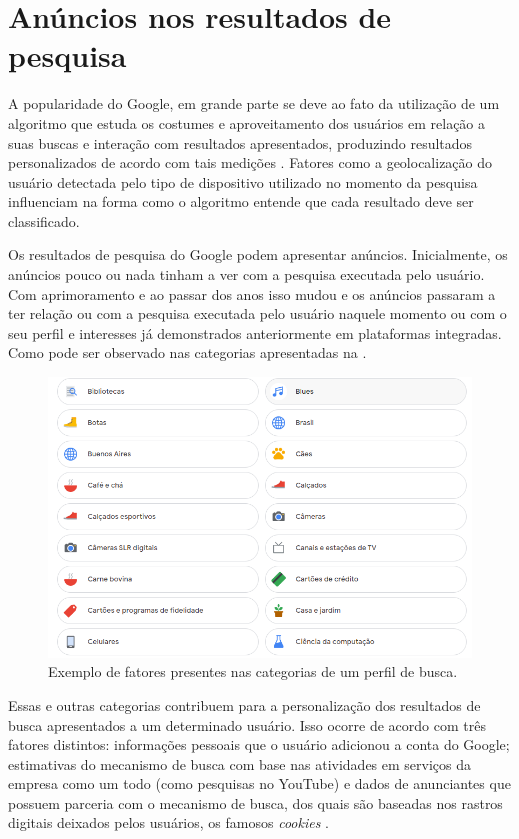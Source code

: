 \documentclass[portuguese]{textolivre}
\begin{document}
\section{Anúncios nos resultados de pesquisa}\label{sec-normas}
A popularidade do Google, em grande parte se deve ao fato da utilização de um algoritmo que estuda os costumes e aproveitamento dos usuários em relação a suas buscas e interação com resultados apresentados, produzindo resultados personalizados de acordo com tais medições \cite{yus_en_2011}. Fatores como a geolocalização do usuário detectada pelo tipo de dispositivo utilizado no momento da pesquisa influenciam na forma como o algoritmo entende que cada resultado deve ser classificado.

Os resultados de pesquisa do Google podem apresentar anúncios. Inicialmente, os anúncios pouco ou nada tinham a ver com a pesquisa executada pelo usuário. Com aprimoramento e ao passar dos anos isso mudou e os anúncios passaram a ter relação ou com a pesquisa executada pelo usuário naquele momento ou com o seu perfil e interesses já demonstrados anteriormente em plataformas integradas. Como pode ser observado nas categorias apresentadas na .

\begin{figure}[h!]
    \centering
    \includegraphics[width=0.8\linewidth]{fig-001.png}
    \caption{Exemplo de fatores presentes nas categorias de um perfil de busca.}
    \label{fig1}
\end{figure}

Essas e outras categorias contribuem para a personalização dos resultados de busca apresentados a um determinado usuário. Isso ocorre de acordo com três fatores distintos: informações pessoais que o usuário adicionou a conta do Google; estimativas do mecanismo de busca com base nas atividades em serviços da empresa como um todo (como pesquisas no YouTube) e dados de anunciantes que possuem parceria com o mecanismo de busca, dos quais são baseadas nos rastros digitais deixados pelos usuários, os famosos \textit{cookies} \cite{rosa_publicidade_2022,google_uncios_2022}.
\end{document}

